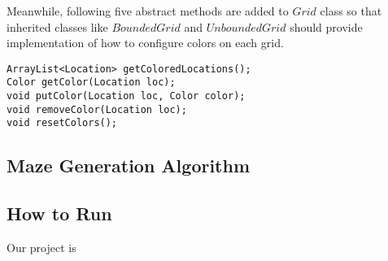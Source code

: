Meanwhile, following five abstract methods are added to $Grid$ class so that
inherited classes like $BoundedGrid$ and $UnboundedGrid$ should provide 
implementation of how to configure colors on each grid.
\begin{lstlisting}
ArrayList<Location> getColoredLocations();
Color getColor(Location loc);
void putColor(Location loc, Color color);
void removeColor(Location loc);
void resetColors();
\end{lstlisting}


\subsection{Maze Generation Algorithm}

\subsection{How to Run}

Our project is 
